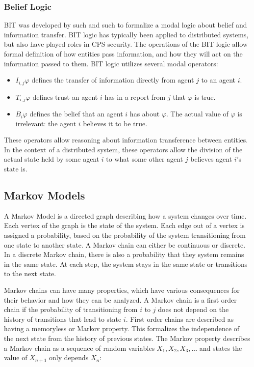 \subsubsection{Belief Logic}

BIT was developed by such and such to formalize a modal logic about belief and information transfer. BIT logic has typically been applied to distributed systems, but also have played roles in CPS security. The operations of the BIT logic allow formal definition of how entities pass information, and how they will act on the information passed to them. BIT logic utilizes several modal operators:

\begin{itemize}
\item $I_{i,j} \varphi$ defines the transfer of information directly from agent $j$ to an agent $i$. 
\item $T_{i,j} \varphi$ defines trust an agent $i$ has in a report from $j$ that $\varphi$ is true.
\item $B_i \varphi$ defines the belief that an agent $i$ has about $\varphi$. The actual value of $\varphi$ is irrelevant: the agent $i$ believes it to be true.
\end{itemize}

These operators allow reasoning about information transference between entities. In the context of a distributed system, these operators allow the division of the actual state held by some agent $i$ to what some other agent $j$ believes agent $i$'s state is.

\subsection{Markov Models}

A Markov Model is a directed graph describing how a system changes over time. Each vertex of the graph is the state of the system. Each edge out of a vertex is assigned a probability, based on the probability of the system transitioning from one state to another state. A Markov chain can either be continuous or discrete. In a discrete Markov chain, there is also a probability that they system remains in the same state. At each step, the system stays in the same state or transitions to the next state.

Markov chains can have many properties, which have various consequences for their behavior and how they can be analyzed. A Markov chain is a first order chain if the probability of transitioning from $i$ to $j$ does not depend on the history of transitions that lead to state $i$.
First order chains are described as having a memoryless or Markov property.
This formalizes the independence of the next state from the history of previous states.
The Markov property describes a Markov chain as a sequence of random variables $X_{1}, X_{2}, X_{3}, ...$ and states the value of $X_{n+1}$ only depends $X_{n}$: \cite{MARKOV3}

